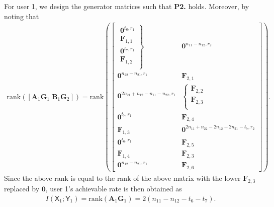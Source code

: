 \documentclass[12pt, draftclsnofoot, onecolumn]{IEEEtran}
\newcommand{\msf}[1]{\mathsf{#1}}
\theoremstyle{definition}
\begin{document}
For user 1, we design the generator matrices such that {\bf P2.} holds. Moreover, by noting that
\begin{align}\label{eq:weak1_2c_u1}
\text{rank}([\boldsymbol{A}_1\boldsymbol{G}_1 \; \boldsymbol{B}_1\boldsymbol{G}_2]) =\text{rank}\left(
\begin{bmatrix}
\left. {\begin{array}{*{20}{c}}
\boldsymbol{0}^{t_6,r_1}\\
\boldsymbol{F}_{1,1}\\
\boldsymbol{0}^{t_7,r_1}\\
\boldsymbol{F}_{1,2} \\
\end{array}} \right\} & \boldsymbol{0}^{n_{11}-n_{12},r_2} \\
\boldsymbol{0}^{n_{22}-n_{21},r_1} & \boldsymbol{F}_{2,1} \\
\boldsymbol{0}^{2n_{21}+n_{12}-n_{11}-n_{22},r_1}  & \left\{ {\begin{array}{*{20}{c}}
\boldsymbol{F}_{2,2} \\
\boldsymbol{F}_{2,3} \\
\end{array}} \right.\\
\boldsymbol{0}^{t_7,r_1} & \boldsymbol{F}_{2,4} \\
\boldsymbol{F}_{1,3} & \boldsymbol{0}^{2n_{11}+n_{22}-2n_{12}-2n_{21}-t_7,r_2}\\
\boldsymbol{0}^{t_6,r_1} & \boldsymbol{F}_{2,5}\\
\boldsymbol{F}_{1,4}& \boldsymbol{F}_{2,3}\\
\boldsymbol{0}^{n_{12}-n_{21},r_1} &\boldsymbol{F}_{2,6}
\end{bmatrix}\right).
\end{align}
Since the above rank is equal to the rank of the above matrix with the lower $\boldsymbol{F}_{2,3}$ replaced by $\boldsymbol{0}$, user 1's achievable rate is then obtained as
\begin{align}
I(\msf{X}_1;\msf{Y}_1) = \text{rank}(\boldsymbol{A}_1\boldsymbol{G}_1) = 2(n_{11}-n_{12}-t_6-t_7).
\end{align}
\end{document}
